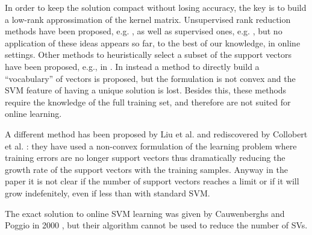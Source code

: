 In order to keep the solution compact without losing accuracy, the key
is to build a low-rank approssimation of the kernel matrix.
Unsupervised rank reduction methods have been proposed, e.g.
\cite{Baudat03}, as well as supervised ones, e.g. \cite{BachJordan2005}, but
no application of these ideas appears so far, to the best of our
knowledge, in online settings.
Other methods to heuristically select a subset of the support vectors have been
proposed, e.g., in \cite{LeeM01,KeerthiCDC06}. In \cite{WuSB06} instead a method
to directly build a ``vocabulary'' of vectors is proposed, but the formulation
is not convex and the SVM feature of having a unique solution is lost.
Besides this, these methods require the knowledge of the full training set,
and therefore are not suited for online learning.

A different method has been proposed by Liu et al. \cite{LiuSD05} and
rediscovered by Collobert et al. \cite{CollobertSWB06}:
they have used a non-convex formulation of the learning problem where
training errors are no longer support vectors thus dramatically reducing the
growth rate of the support vectors with the training samples.
Anyway in the paper it is not clear if the number of support vectors reaches
a limit or if it will grow indefenitely, even if less than with standard
SVM.

The exact solution to online SVM learning was given by Cauwenberghs
and Poggio in 2000 \cite{CauwenberghsP00}, but
their algorithm cannot be used to reduce the number of SVs.
